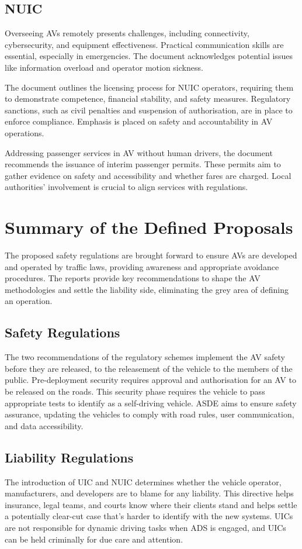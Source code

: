 \documentclass[12pt]{report} %
\begin{document}
		\subsection*{NUIC}
			Overseeing AVs remotely presents challenges, including connectivity, cybersecurity, and equipment effectiveness. Practical communication skills are essential, especially in emergencies. The document acknowledges potential issues like information overload and operator motion sickness.

			The document outlines the licensing process for NUIC operators, requiring them to demonstrate competence, financial stability, and safety measures. Regulatory sanctions, such as civil penalties and suspension of authorisation, are in place to enforce compliance. Emphasis is placed on safety and accountability in AV operations.
			
			Addressing passenger services in AV without human drivers, the document recommends the issuance of interim passenger permits. These permits aim to gather evidence on safety and accessibility and whether fares are charged. Local authorities' involvement is crucial to align services with regulations.

	\section{Summary of the Defined Proposals}
		The proposed safety regulations are brought forward to ensure AVs are developed and operated by traffic laws, providing awareness and appropriate avoidance procedures. The reports provide key recommendations to shape the AV methodologies and settle the liability side, eliminating the grey area of defining an operation.

		\subsection*{Safety Regulations}
			The two recommendations of the regulatory schemes implement the AV safety before they are released, to the releasement of the vehicle to the members of the public. Pre-deployment security requires approval and authorisation for an AV to be released on the roads. This security phase requires the vehicle to pass appropriate tests to identify as a self-driving vehicle. ASDE aims to ensure safety assurance, updating the vehicles to comply with road rules, user communication, and data accessibility.
	
		\subsection*{Liability Regulations}
			The introduction of UIC and NUIC determines whether the vehicle operator, manufacturers, and developers are to blame for any liability. This directive helps insurance, legal teams, and courts know where their clients stand and helps settle a potentially clear-cut case that's harder to identify with the new systems. UICs are not responsible for dynamic driving tasks when ADS is engaged, and UICs can be held criminally for due care and attention.
\end{document}
